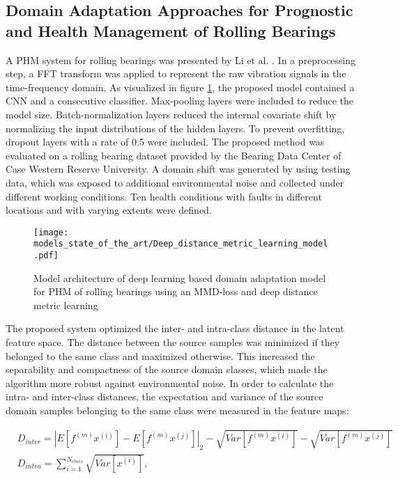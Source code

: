 \subsection{Domain Adaptation Approaches for Prognostic and Health Management of Rolling Bearings}

A PHM system for rolling bearings was presented by Li et al. \cite{Li2018}. In a preprocessing step, a FFT transform was applied to represent the raw vibration signals in the time-frequency domain. As visualized in figure \ref{fig:Deep_distance_metric_learning_model}, the proposed model contained a CNN and a consecutive classifier. Max-pooling layers were included to reduce the model size. Batch-normalization layers reduced the internal covariate shift by normalizing the input distributions of the hidden layers. To prevent overfitting, dropout layers with a rate of 0.5 were included. The proposed method was evaluated on a rolling bearing dataset provided by the Bearing Data Center of Case Western Reserve University. A domain shift was generated by using testing data, which was exposed to additional environmental noise and collected under different working conditions. Ten health conditions with faults in different locations and with varying extents were defined. 

\begin{figure}[H]
  \centering
  \texttt{[image: models\_state\_of\_the\_art/Deep\_distance\_metric\_learning\_model.pdf]}
  \caption{Model architecture of deep learning based domain adaptation model for PHM of rolling bearings using an MMD-loss and deep distance metric learning \cite{Li2018}}
  \label{fig:Deep_distance_metric_learning_model}
\end{figure}


The proposed system optimized the inter- and intra-class distance in the latent feature space. The distance between the source samples was minimized if they belonged to the same class and maximized otherwise. This increased the separability and compactness of the source domain classes, which made the algorithm more robust against environmental noise. In order to calculate the intra- and inter-class distances, the expectation and variance of the source domain samples belonging to the same class were measured in the feature maps:

\begin{equation}
    \begin{aligned}
       &D_{inter} = |E[f^{(m)}x^{(i)}]-E[f^{(m)}x^{(j)}]|_{2}-\sqrt{Var[f^{(m)}x^{(i)}]}-\sqrt{Var[f^{(m)}x^{(j)}]}\\
       &D_{intra} = 
        \sum_{i=1}^{N_{class}} \sqrt{Var[x^{(i)}]},
    \end{aligned}
\end{equation}

